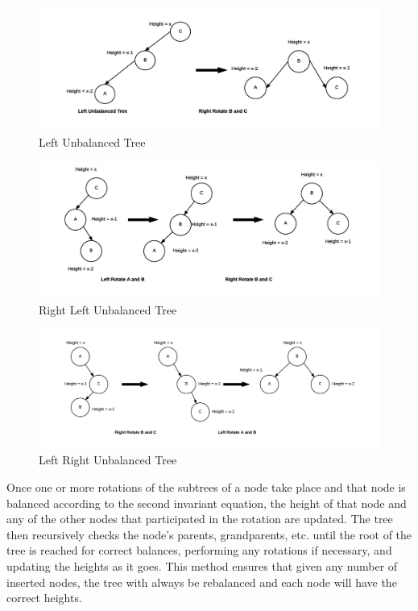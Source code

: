 \documentclass[12pt]{article}
\begin{document}
\noindent
\begin{figure}[h]
\caption{Left Unbalanced Tree}
\includegraphics[width=12cm]{left_unbalanced_tree.png}
\centering
\end{figure}
\noindent
\begin{figure}[h]
\caption{Right Left Unbalanced Tree}
\includegraphics[width=12cm]{right_left_unbalanced_tree.png}
\centering
\end{figure}
\noindent
\begin{figure}[h]
\caption{Left Right Unbalanced Tree}
\includegraphics[width=12cm]{left_right_unbalanced_tree.png}
\centering
\end{figure}
\noindent
Once one or more rotations of the subtrees of a node take place and that node
is balanced according to the second invariant equation, the height of that node
and any of the other nodes that participated in the rotation are updated.  The
tree then recursively checks the node's parents, grandparents, etc. 
until the root of the tree is reached for correct balances, performing any 
rotations if necessary, and updating the heights as it goes.  This method
ensures that given any number of inserted nodes, the tree with always be
rebalanced and each node will have the correct heights.
\end{document}
